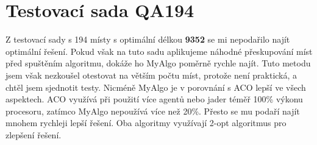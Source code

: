 \section{Testovací sada QA194 }
Z testovací sady s 194 místy s optimální délkou \textbf{9352} se mi nepodařilo najít optimální řešení. Pokud však na tuto sadu aplikujeme náhodné přeskupování míst před spuštěním algoritmu, dokáže ho MyAlgo poměrně rychle najít. Tuto metodu jsem však nezkoušel otestovat na větším počtu míst, protože není praktická, a chtěl jsem sjednotit testy. Nicméně MyAlgo je v porovnání s ACO lepší ve všech aspektech. ACO využívá při použití více agentů nebo jader téměř 100\% výkonu procesoru, zatímco MyAlgo nepoužívá více než 20\%. Přesto se mu podaří najít mnohem rychleji lepší řešení. Oba algoritmy využívají 2-opt algoritmus pro zlepšení řešení.


\begin{table}[H]
\centering
\caption{QA194 -- ACO}
\end{table}

